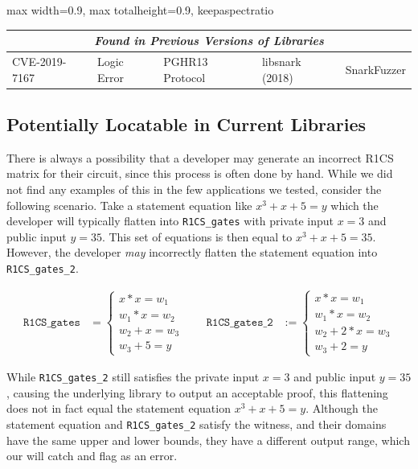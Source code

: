\begin{table}[!htp]
{{\begin{adjustbox}{max width=0.9\textheight, max totalheight=0.9\textwidth, keepaspectratio}
\begin{minipage}{\textheight}
\begin{tabular*}{\textheight}{@{\extracolsep{\fill}}|lllll|}
\multicolumn{5}{|c|}{\textit{Found in Previous Versions of Libraries}} \\ \hline
\multicolumn{1}{|l||}{CVE-2019-7167} & \multicolumn{1}{l|}{Logic Error} & \multicolumn{1}{l|}{PGHR13 Protocol} & \multicolumn{1}{l|}{libsnark (2018)} & SnarkFuzzer \\ \hline
\end{tabular*}

\label{tab:snarkprobe-error_summary}
\end{minipage}
\end{adjustbox}%
}%
}
\end{table}



\subsection{Potentially Locatable in Current Libraries}
There is always a possibility that a developer may generate an incorrect R1CS matrix for their circuit, since this process is often done by hand.
While we did not find any examples of this in the few applications we tested, consider the following scenario.
Take a statement equation like $x^3 + x + 5 = y$ which the developer will typically flatten into \texttt{R1CS\_gates} with private input $x = 3$ and public input $y = 35$.  This set of equations is then equal to $x^3 + x + 5 = 35$. However, the developer \emph{may} incorrectly flatten the statement equation into \texttt{R1CS\_gates\_2}.

\begin{equation}
\label{eq:r1cs-gates}
\begin{aligned}
\texttt{R1CS\_gates}
&=
\begin{cases}
x * x = w_{1} \\
w_{1} * x = w_{2} \\
w_{2} + x = w_{3} \\
w_{3} + 5 = y
\end{cases}
\qquad
\texttt{R1CS\_gates\_2}
&:=
\begin{cases}
x * x = w_{1} \\
w_{1} * x = w_{2} \\
w_{2} + 2 * x = w_{3} \\
w_{3} + 2 = y
\end{cases}
\end{aligned}
\end{equation}

While \texttt{R1CS\_gates\_2} still satisfies the private input $x = 3$ and public input $y = 35$, causing the underlying library to output an acceptable proof, this flattening does not in fact equal the statement equation $x^3 + x + 5 = y$.
Although the statement equation and \texttt{R1CS\_gates\_2} satisfy the witness, and their domains have the same upper and lower bounds, they have a different output range, which our \ConstraintChecker will catch and flag as an error.

